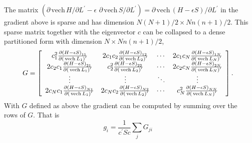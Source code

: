 \documentclass[12pt]{article}
\begin{document}
The matrix $\left(  \partial\,\mathrm{vech}\,H/\partial L^{\prime}%
-\epsilon\,\,\partial\,\mathrm{vech}\,S/\partial L^{\prime}\right)
=\partial\,\mathrm{vech}\,\left(  H-\epsilon S\right)  /\partial L^{\prime}$
in the gradient above is sparse and has dimension $N\left(  N+1\right)
/2\times Nn\left(  n+1\right)  /2$. This sparse matrix together with the
eigenvector $c$ can be collapsed to a dense partitioned form with dimension
$N\times Nn\left(  n+1\right)  /2$,
\begin{equation}
G=\left[
\begin{array}
[c]{cccc}%
c_{1}^{2}\frac{\partial\left(  H-\epsilon S\right)  _{11}}{\partial\left(
\,\mathrm{vech}\,L_{1}\right)  ^{\prime}} & 2c_{1}c_{2}\frac{\partial\left(
H-\epsilon S\right)  _{12}}{\partial\left(  \,\mathrm{vech}\,L_{2}\right)
^{\prime}} & \cdots & 2c_{1}c_{N}\frac{\partial\left(  H-\epsilon S\right)
_{1N}}{\partial\left(  \,\mathrm{vech}\,L_{N}\right)  ^{\prime}}\\
2c_{2}c_{1}\frac{\partial\left(  H-\epsilon S\right)  _{21}}{\partial\left(
\,\mathrm{vech}\,L_{1}\right)  ^{\prime}} & c_{2}^{2}\frac{\partial\left(
H-\epsilon S\right)  _{22}}{\partial\left(  \,\mathrm{vech}\,L_{2}\right)
^{\prime}} & \cdots & 2c_{2}c_{N}\frac{\partial\left(  H-\epsilon S\right)
_{2N}}{\partial\left(  \,\mathrm{vech}\,L_{N}\right)  ^{\prime}}\\
\vdots & \vdots & \ddots & \vdots\\
2c_{N}c_{1}\frac{\partial\left(  H-\epsilon S\right)  _{N1}}{\partial\left(
\,\mathrm{vech}\,L_{1}\right)  ^{\prime}} & 2c_{N}c_{2}\frac{\partial\left(
H-\epsilon S\right)  _{N2}}{\partial\left(  \,\mathrm{vech}\,L_{2}\right)
^{\prime}} & \cdots &  c_{N}^{2}\frac{\partial\left(  H-\epsilon S\right)
_{NN}}{\partial\left(  \,\mathrm{vech}\,L_{N}\right)  ^{\prime}}%
\end{array}
\right]  .
\end{equation}
With $G$ defined as above the gradient can be computed by summing over the
rows of $G$. That is
\[
g_{i}=\frac{1}{c^{\prime}Sc}\sum_{j}G_{ji}%
\]
\end{document}
